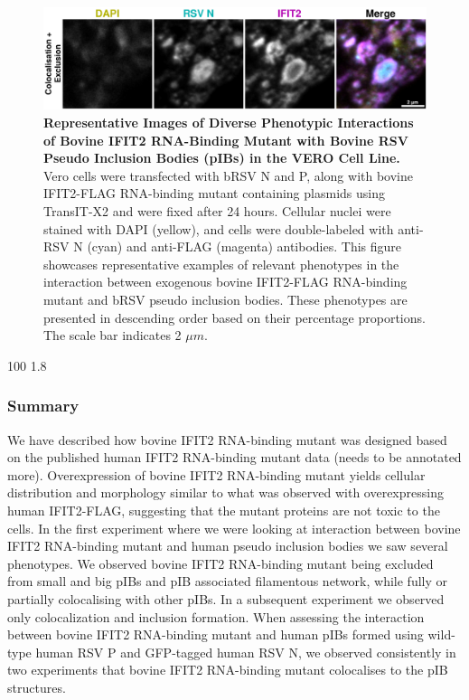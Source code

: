 \begin{figure}
    \centering
    \includegraphics[width=1\linewidth]{08. Chapter 3/Figs/03. pIB/03. IFIT2/05. IFIT2-RNA binding mutant/02. pIB/06. bi2f24-bnbp.pdf}
    \caption[Representative Images of Diverse Phenotypic Interactions of Bovine IFIT2 RNA-Binding Mutant with Bovine RSV Pseudo Inclusion Bodies (pIBs) in the VERO Cell Line.]{\textbf{Representative Images of Diverse Phenotypic Interactions of Bovine IFIT2 RNA-Binding Mutant with Bovine RSV Pseudo Inclusion Bodies (pIBs) in the VERO Cell Line.}  Vero cells were transfected with bRSV N and P, along with bovine IFIT2-FLAG RNA-binding mutant containing plasmids using TransIT-X2 and were fixed after 24 hours. Cellular nuclei were stained with DAPI (yellow), and cells were double-labeled with anti-RSV N (cyan) and anti-FLAG (magenta) antibodies. This figure showcases representative examples of relevant phenotypes in the interaction between exogenous bovine IFIT2-FLAG RNA-binding mutant and bRSV pseudo inclusion bodies. These phenotypes are presented in descending order based on their percentage proportions. The scale bar indicates 2 \(\mu m\).}
    \label{fig:Representative Images of Diverse Phenotypic Interactions of Bovine IFIT2 RNA-Binding Mutant with Bovine RSV Pseudo Inclusion Bodies (pIBs) in the VERO Cell Line}
\end{figure}

100
1.8

\subsubsection{Summary}
We have described how bovine IFIT2 RNA-binding mutant was designed based on the published human IFIT2 RNA-binding mutant data (needs to be annotated more). Overexpression of bovine IFIT2 RNA-binding mutant yields cellular distribution and morphology similar to what was observed with overexpressing human IFIT2-FLAG, suggesting that the mutant proteins are not toxic to the cells. In the first experiment where we were looking at interaction between bovine IFIT2 RNA-binding mutant and human pseudo inclusion bodies we saw several phenotypes. We observed bovine IFIT2 RNA-binding mutant being excluded from small and big pIBs and pIB associated filamentous network, while fully or partially colocalising with other pIBs. In a subsequent experiment we observed only colocalization and inclusion formation. When assessing the interaction between bovine IFIT2 RNA-binding mutant and human pIBs formed using wild-type human RSV P and GFP-tagged human RSV N, we observed consistently in two experiments that bovine IFIT2 RNA-binding mutant colocalises to the pIB structures.

